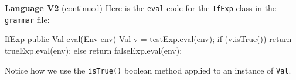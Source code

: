 \begin{minipage}[t]{\sw}
\slidenumber
\LARGE
{\bf Language V2} (continued)\exx
\Large
{}\exx
\LARGE
Here is the \verb'eval' code
for the \verb'IfExp' class in the \verb'grammar' file:
\begin{qv}
IfExp
    public Val eval(Env env) {
        Val v = testExp.eval(env);
        if (v.isTrue())
            return trueExp.eval(env);
        else
            return falseExp.eval(env);
    }
\end{qv}
Notice how we use the \verb'isTrue()' boolean method applied
to an instance of \verb'Val'.\exx
\end{minipage}
